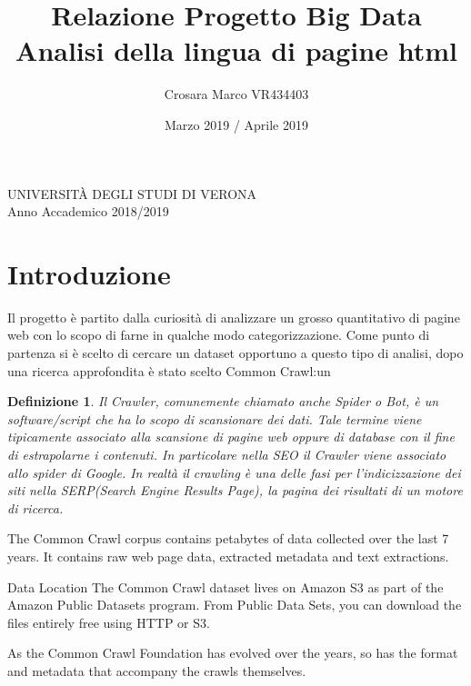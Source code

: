 \documentclass{article}
\title{Relazione Progetto Big Data\\Analisi della lingua di pagine html}
\author{Crosara Marco VR434403}
\date{Marzo 2019 / Aprile 2019}
\newtheorem*{definition}{Definizione}
\begin{document}
\maketitle
\thispagestyle{empty}

\vspace{\fill}

\begin{center}
  UNIVERSITÀ DEGLI STUDI DI VERONA\\
Anno Accademico 2018/2019
\end{center}

\newpage

\tableofcontents
\thispagestyle{empty}

\newpage


\section{Introduzione}

Il progetto è partito dalla curiosità di analizzare un grosso quantitativo di pagine web con lo scopo di farne in qualche modo categorizzazione. Come punto di partenza si è scelto di cercare un dataset opportuno a questo tipo di analisi, dopo una ricerca approfondita è stato scelto Common Crawl\cite{commoncrawl}:un 

\begin{definition}
Il Crawler, comunemente chiamato anche Spider o Bot, è un software/script che ha lo scopo di scansionare dei dati. Tale termine viene tipicamente associato alla scansione di pagine web oppure di database con il fine di estrapolarne i contenuti. In particolare nella SEO il Crawler viene associato allo spider di Google. In realtà il crawling è una delle fasi per l’indicizzazione dei siti nella SERP(Search Engine Results Page), la pagina dei risultati di un motore di ricerca.
\end{definition}

The Common Crawl corpus contains petabytes of data collected over the last 7 years. It contains raw web page data, extracted metadata and text extractions.

Data Location
The Common Crawl dataset lives on Amazon S3 as part of the Amazon Public Datasets program.
From Public Data Sets, you can download the files entirely free using HTTP or S3.

As the Common Crawl Foundation has evolved over the years, so has the format and metadata that accompany the crawls themselves.
\end{document}
